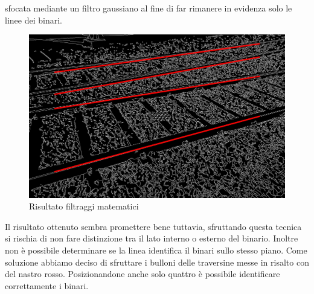 \documentclass[twoside]{supsistudent}
\begin{document}
sfocata mediante un filtro gaussiano al fine di far rimanere in evidenza solo le linee dei binari.
\begin{figure}[H]
  \center
  \includegraphics[scale=0.25]{images/houghLinesMerged.jpg}
  \caption{Risultato filtraggi matematici}
\end{figure}
Il risultato ottenuto sembra promettere bene tuttavia, sfruttando questa tecnica si rischia di non fare distinzione tra 
il lato interno o esterno del binario. Inoltre non è possibile determinare se la linea identifica il binari sullo stesso piano. 
Come soluzione abbiamo deciso di sfruttare i bulloni delle traversine messe in risalto con del nastro rosso. Posizionandone anche solo 
quattro è possibile identificare correttamente i binari. 
\end{document}
